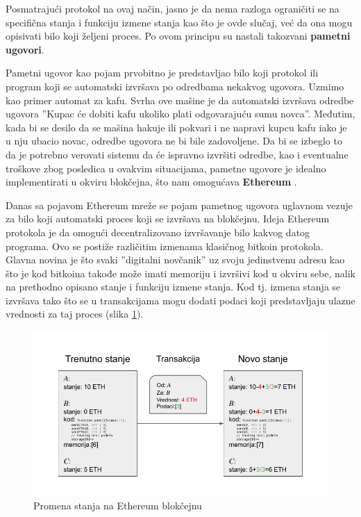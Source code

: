 \documentclass[a4paper]{article}
\begin{document}
Posmatrajući protokol na ovaj način, jasno je da nema razloga ograničiti se na specifična stanja i funkciju izmene stanja kao što je ovde slučaj, već da ona mogu opisivati bilo koji željeni proces.
Po ovom principu su nastali takozvani \textbf{pametni ugovori}.

Pametni ugovor kao pojam prvobitno je predstavljao bilo koji protokol ili program koji se automatski izvršava po odredbama nekakvog ugovora.
Uzmimo kao primer automat za kafu.
Svrha ove mašine je da automatski izvršava odredbe ugovora ''Kupac će dobiti kafu ukoliko plati odgovarajuću sumu novca''. Međutim, kada bi se desilo da se mašina hakuje ili pokvari i ne napravi kupcu kafu iako je u nju ubacio novac, odredbe ugovora ne bi bile zadovoljene.
Da bi se izbeglo to da je potrebno verovati sistemu da će ispravno izvršiti odredbe, kao i eventualne troškove zbog posledica u ovakvim situacijama, pametne ugovore je idealno implementirati u okviru blokčejna, što nam omogućava \textbf{Ethereum} \cite{eth-whitepaper}.

Danas sa pojavom Ethereum mreže se pojam pametnog ugovora uglavnom vezuje za bilo koji automatski proces koji se izvršava na blokčejnu.
Ideja Ethereum protokola je da omogući decentralizovano izvršavanje bilo kakvog datog programa. Ovo se postiže različitim izmenama klasičnog bitkoin protokola.
Glavna novina je što svaki ''digitalni novčanik'' uz svoju jedinstvenu adresu kao što je kod bitkoina takođe može imati memoriju i izvršivi kod u okviru sebe, nalik na prethodno opisano stanje i funkciju izmene stanja.
Kod tj. izmena stanja se izvršava tako što se u transakcijama mogu dodati podaci koji predstavljaju ulazne vrednosti za taj proces (slika \ref{fig:ethereum_state_transition}).

\begin{figure}[H]
    \centering
        \includegraphics[scale=0.8]{Ethereum_State_Transition.pdf}
    \caption{Promena stanja na Ethereum blokčejnu}
    \label{fig:ethereum_state_transition}
\end{figure}
\end{document}
